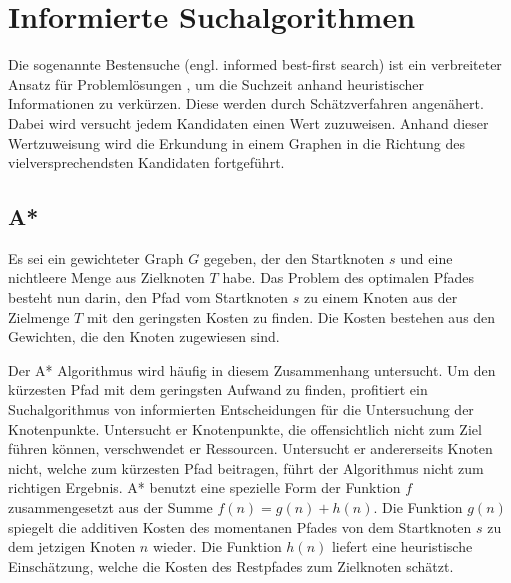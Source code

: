 \section{Informierte Suchalgorithmen}

Die sogenannte Bestensuche (engl. informed best-first search)  %
ist ein verbreiteter Ansatz für Problemlösungen %
, um die Suchzeit %
anhand heuristischer Informationen zu verkürzen. Diese %
werden durch Schätzverfahren angenähert. Dabei wird versucht jedem Kandidaten %
einen Wert zuzuweisen. Anhand dieser Wertzuweisung wird die Erkundung in einem Graphen in die Richtung des vielversprechendsten Kandidaten fortgeführt. 

\subsection{A*} 

Es sei ein gewichteter Graph $G$ gegeben, der den Startknoten $s$ und eine nichtleere Menge aus Zielknoten $T$ habe. Das Problem des optimalen Pfades besteht nun darin, den Pfad vom Startknoten $s$ zu einem Knoten aus der Zielmenge $T$ mit den geringsten Kosten zu finden. %
Die Kosten bestehen aus den Gewichten, die den Knoten zugewiesen sind\cite{RinaDechterandJudeaPearl.1983}.

Der A* Algorithmus wird häufig in diesem Zusammenhang untersucht. Um den kürzesten Pfad mit dem geringsten Aufwand zu finden, profitiert ein Suchalgorithmus von informierten Entscheidungen für die Untersuchung der Knotenpunkte. Untersucht er Knotenpunkte, die offensichtlich nicht zum Ziel führen können, verschwendet er Ressourcen. Untersucht er andererseits Knoten nicht, welche zum kürzesten Pfad beitragen, führt der Algorithmus nicht zum richtigen Ergebnis. %
A* benutzt eine spezielle Form der Funktion $f$ zusammengesetzt aus der Summe $f(n) = g(n) + h(n)$. Die Funktion $g(n)$ spiegelt die additiven Kosten des momentanen Pfades von dem Startknoten $s$ zu dem jetzigen Knoten $n$ wieder. Die Funktion $h(n)$ liefert eine heuristische Einschätzung, welche die Kosten des Restpfades zum Zielknoten schätzt\cite{RinaDechterandJudeaPearl.1983}. %

